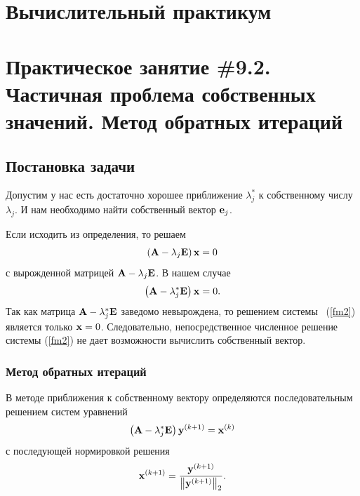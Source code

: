 \documentclass[12pt]{article}
\begin{document}
	\begin{flushright}
	\end{flushright}
	\begin{flushright}
	\end{flushright}
    \section*{Вычислительный практикум}
    \section*{Практическое занятие \#9.2. Частичная проблема собственных значений. Метод обратных итераций}

	\subsection*{Постановка задачи}
	
	Допустим у нас есть достаточно хорошее приближение $\lambda_j^{*}$ к собственному числу $\lambda_j$. И нам необходимо найти собственный вектор $\bold{e}_j$.
	
	Если исходить из определения, то решаем
	\begin{equation}
		\left(\bold{A}-\lambda_j\bold{E}\right)\bold{x}=0
	\end{equation}
	с вырожденной матрицей $\bold{A}-\lambda_j\bold{E}$. В нашем случае
	\begin{equation}
		\left(\bold{A}-\lambda_j^{*}\bold{E}\right)\bold{x}=0.\label{fm2}
	\end{equation}
	Так как матрица $\bold{A}-\lambda_j^{*}\bold{E}$ заведомо невырождена, то решением системы~ (\ref{fm2}) является только $\bold{x}=0$. Следовательно, непосредственное численное решение системы (\ref{fm2}) не дает возможности вычислить собственный вектор.
	
	\subsubsection*{Метод обратных итераций}
	
	В методе приближения к собственному вектору определяются последовательным решением систем уравнений
	\begin{equation}
		\left(\bold{A}-\lambda_j^{*}\bold{E}\right)\bold{y}^{\left(k+1\right)}=\bold{x}^{\left(k\right)}\label{fm6}
	\end{equation}
	с последующей нормировкой решения
	\begin{equation}
		\bold{x}^{\left(k+1\right)}=\frac{\bold{y}^{\left(k+1\right)}}{\left\|\bold{y}^{\left(k+1\right)}\right\|_2}.
	\end{equation}
	
\end{document}

